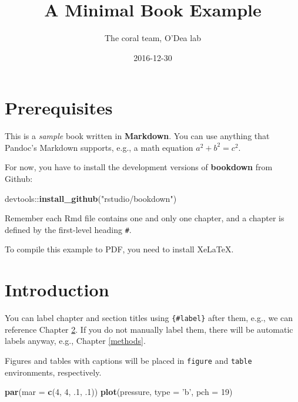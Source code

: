 \documentclass[]{book}
\title{A Minimal Book Example}
\author{The coral team, O'Dea lab}
\date{2016-12-30}
\newenvironment{Shaded}{\begin{snugshade}}{\end{snugshade}}
\newcommand{\KeywordTok}[1]{\textcolor[rgb]{0.13,0.29,0.53}{\textbf{{#1}}}}
\newcommand{\DataTypeTok}[1]{\textcolor[rgb]{0.13,0.29,0.53}{{#1}}}
\newcommand{\DecValTok}[1]{\textcolor[rgb]{0.00,0.00,0.81}{{#1}}}
\newcommand{\StringTok}[1]{\textcolor[rgb]{0.31,0.60,0.02}{{#1}}}
\newcommand{\NormalTok}[1]{{#1}}
\begin{document}
\maketitle

{
\setcounter{tocdepth}{1}
\tableofcontents
}
\chapter{Prerequisites}\label{prerequisites}

This is a \emph{sample} book written in \textbf{Markdown}. You can use
anything that Pandoc's Markdown supports, e.g., a math equation
\(a^2 + b^2 = c^2\).

For now, you have to install the development versions of
\textbf{bookdown} from Github:

\begin{Shaded}
\begin{Highlighting}[]
\NormalTok{devtools::}\KeywordTok{install_github}\NormalTok{(}\StringTok{"rstudio/bookdown"}\NormalTok{)}
\end{Highlighting}
\end{Shaded}

Remember each Rmd file contains one and only one chapter, and a chapter
is defined by the first-level heading \texttt{\#}.

To compile this example to PDF, you need to install XeLaTeX.

\chapter{Introduction}\label{intro}

You can label chapter and section titles using \texttt{\{\#label\}}
after them, e.g., we can reference Chapter \ref{intro}. If you do not
manually label them, there will be automatic labels anyway, e.g.,
Chapter \ref{methods}.

Figures and tables with captions will be placed in \texttt{figure} and
\texttt{table} environments, respectively.

\begin{Shaded}
\begin{Highlighting}[]
\KeywordTok{par}\NormalTok{(}\DataTypeTok{mar =} \KeywordTok{c}\NormalTok{(}\DecValTok{4}\NormalTok{, }\DecValTok{4}\NormalTok{, .}\DecValTok{1}\NormalTok{, .}\DecValTok{1}\NormalTok{))}
\KeywordTok{plot}\NormalTok{(pressure, }\DataTypeTok{type =} \StringTok{'b'}\NormalTok{, }\DataTypeTok{pch =} \DecValTok{19}\NormalTok{)}
\end{Highlighting}
\end{Shaded}
\end{document}
